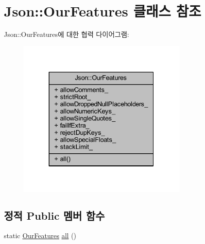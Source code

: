 \hypertarget{class_json_1_1_our_features}{}\section{Json\+:\+:Our\+Features 클래스 참조}
\label{class_json_1_1_our_features}


Json\+:\+:Our\+Features에 대한 협력 다이어그램\+:\nopagebreak
\begin{figure}[H]
\begin{center}
\leavevmode
\includegraphics[width=241pt]{class_json_1_1_our_features__coll__graph}
\end{center}
\end{figure}
\subsection*{정적 Public 멤버 함수}
\begin{DoxyCompactItemize}
\item 
static \hyperlink{class_json_1_1_our_features}{Our\+Features} \hyperlink{class_json_1_1_our_features_a0686e1406b6677f496529f9f3fe98d1e}{all} ()
\end{DoxyCompactItemize}
